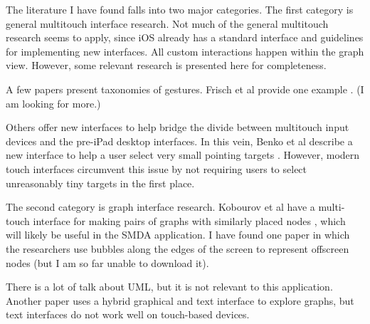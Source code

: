 The literature I have found falls into two major categories. The first
category is general multitouch interface research. Not much of the general
multitouch research seems to apply, since iOS already has a standard interface
and guidelines for implementing new interfaces. All custom interactions happen
within the graph view. However, some relevant research is presented here for
completeness.

A few papers present taxonomies of gestures. Frisch et al provide one example
\cite{multitouch:gestures}. (I am looking for more.)

Others offer new interfaces to help bridge the divide between multitouch input
devices and the pre-iPad desktop interfaces. In this vein, Benko et al describe
a new interface to help a user select very small pointing targets
\cite{multitouch:tiny-select}. However, modern touch interfaces circumvent this
issue by not requiring users to select unreasonably tiny targets in the first
place.

The second category is graph interface research. Kobourov et al have a
multi-touch interface for making pairs of graphs with similarly placed nodes
\cite{graph-interaction:simultaneousgraphdrawing}, which will likely be useful
in the SMDA application. I have found one paper in which the researchers use
bubbles along the edges of the screen to represent offscreen nodes (but I am so
far unable to download it).

There is a lot of talk about UML, but it is not relevant to this application.
Another paper uses a hybrid graphical and text interface to explore graphs, but
text interfaces do not work well on touch-based devices.
